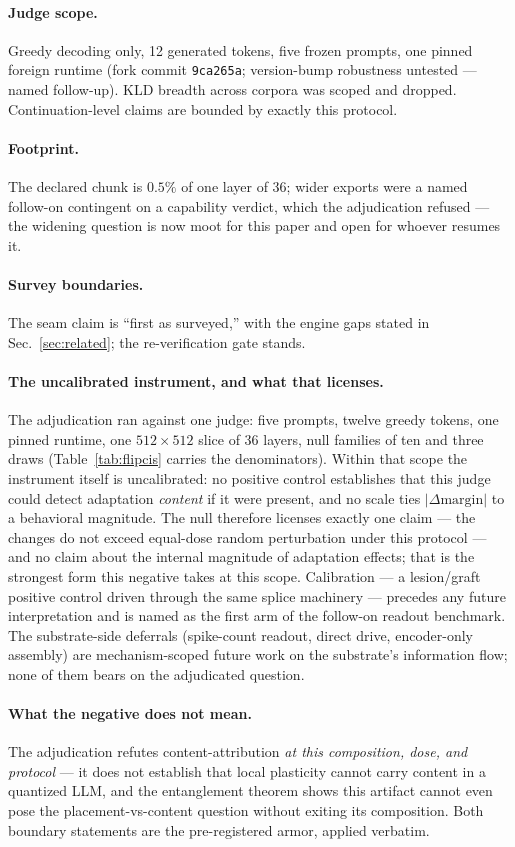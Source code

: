 \paragraph{Judge scope.} Greedy decoding only, 12 generated tokens,
five frozen prompts, one pinned foreign runtime (fork commit
\texttt{9ca265a}; version-bump robustness untested --- named
follow-up). KLD breadth across corpora was scoped and dropped.
Continuation-level claims are bounded by exactly this protocol.

\paragraph{Footprint.} The declared chunk is $0.5\%$ of one layer of
36; wider exports were a named follow-on contingent on a capability
verdict, which the adjudication refused --- the widening question is
now moot for this paper and open for whoever resumes it.

\paragraph{Survey boundaries.} The seam claim is ``first as
surveyed,'' with the engine gaps stated in
Sec.~\ref{sec:related}; the re-verification gate stands.

\paragraph{The uncalibrated instrument, and what that licenses.}
The adjudication ran against one judge: five prompts, twelve greedy
tokens, one pinned runtime, one $512\times512$ slice of 36 layers,
null families of ten and three draws
(Table~\ref{tab:flipcis} carries the denominators). Within that
scope the instrument itself is uncalibrated: no positive control
establishes that this judge could detect adaptation \emph{content}
if it were present, and no scale ties
$|\Delta\mathrm{margin}|$ to a behavioral magnitude. The null
therefore licenses exactly one claim --- the changes do not exceed
equal-dose random perturbation under this protocol --- and no claim
about the internal magnitude of adaptation effects; that is the
strongest form this negative takes at this scope. Calibration ---
a lesion/graft positive control driven through the same splice
machinery --- precedes any future interpretation and is named as the
first arm of the follow-on readout benchmark. The substrate-side
deferrals (spike-count readout, direct drive, encoder-only
assembly) are mechanism-scoped future work on the substrate's
information flow; none of them bears on the adjudicated question.

\paragraph{What the negative does not mean.} The adjudication refutes
content-attribution \emph{at this composition, dose, and protocol} ---
it does not establish that local plasticity cannot carry content in a
quantized LLM, and the entanglement theorem shows this artifact
cannot even pose the placement-vs-content question without exiting
its composition. Both boundary statements are the pre-registered
armor, applied verbatim.
